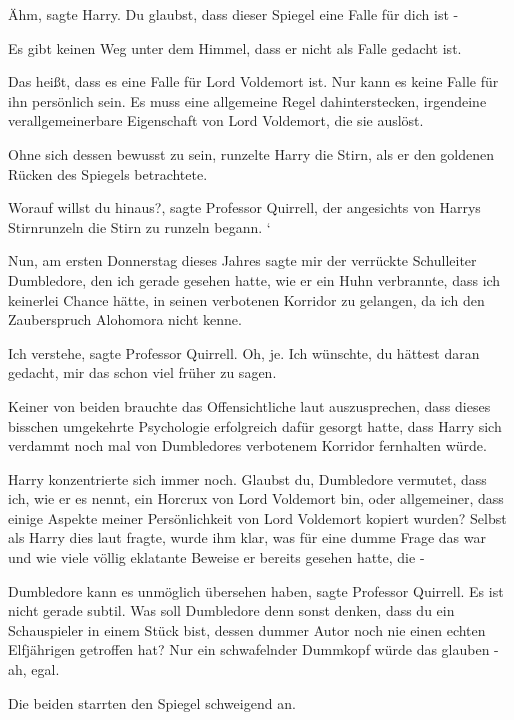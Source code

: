 \glqq{}Ähm\grqq{}, sagte Harry. \glqq{}Du glaubst, dass dieser Spiegel eine Falle
für dich ist -\grqq{}

\glqq{}Es gibt keinen Weg unter dem Himmel, dass er nicht als Falle gedacht
ist.\grqq{}

\glqq{}Das heißt, dass es eine Falle für Lord Voldemort ist. Nur kann es keine
Falle für ihn persönlich sein. Es muss eine allgemeine Regel dahinterstecken,
irgendeine verallgemeinerbare Eigenschaft von Lord Voldemort, die sie
auslöst.\grqq{}

Ohne sich dessen bewusst zu sein, runzelte Harry die Stirn, als er den goldenen
Rücken des Spiegels betrachtete.

\glqq{}Worauf willst du hinaus?\grqq{}, sagte Professor Quirrell, der angesichts
von Harrys Stirnrunzeln die Stirn zu runzeln begann. `

\glqq{}Nun, am ersten Donnerstag dieses Jahres sagte mir der verrückte
Schulleiter Dumbledore, den ich gerade gesehen hatte, wie er ein Huhn
verbrannte, dass ich keinerlei Chance hätte, in seinen verbotenen Korridor zu
gelangen, da ich den Zauberspruch Alohomora nicht kenne.\grqq{}

\glqq{}Ich verstehe\grqq{}, sagte Professor Quirrell. \glqq{}Oh, je. Ich wünschte,
du hättest daran gedacht, mir das schon viel früher zu sagen.\grqq{}

Keiner von beiden brauchte das Offensichtliche laut auszusprechen, dass dieses
bisschen umgekehrte Psychologie erfolgreich dafür gesorgt hatte, dass Harry sich
verdammt noch mal von Dumbledores verbotenem Korridor fernhalten würde.

Harry konzentrierte sich immer noch. \glqq{}Glaubst du, Dumbledore vermutet, dass
ich, wie er es nennt, ein Horcrux von Lord Voldemort bin, oder allgemeiner, dass
einige Aspekte meiner Persönlichkeit von Lord Voldemort kopiert wurden?\grqq{}
Selbst als Harry dies laut fragte, wurde ihm klar, was für eine dumme Frage das
war und wie viele völlig eklatante Beweise er bereits gesehen hatte, die -

\glqq{}Dumbledore kann es unmöglich übersehen haben\grqq{}, sagte Professor
Quirrell. \glqq{}Es ist nicht gerade subtil. Was soll Dumbledore denn sonst
denken, dass du ein Schauspieler in einem Stück bist, dessen dummer Autor noch
nie einen echten Elfjährigen getroffen hat? Nur ein schwafelnder Dummkopf würde
das glauben - ah, egal.\grqq{}

Die beiden starrten den Spiegel schweigend an.


